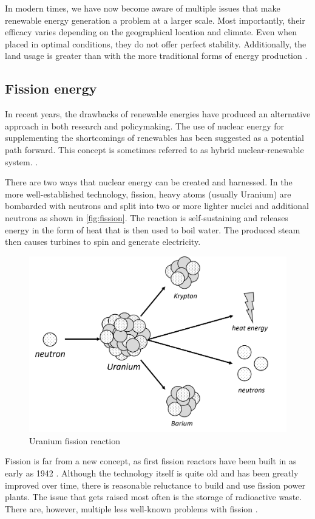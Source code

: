   In modern times, we have now become aware of multiple issues
  that make renewable energy generation a problem at a larger scale.
  Most importantly, their efficacy varies depending on the geographical
  location and climate. Even when placed in optimal conditions,
  they do not offer perfect stability. Additionally, the land
  usage is greater than with the more traditional forms of energy production
  \cite{renewable_problems}.

\subsection{Fission energy}

  In recent years, the drawbacks of renewable energies have produced
  an alternative approach in both research and policymaking. 
  The use of nuclear energy for supplementing the shortcomings 
  of renewables has been suggested as a potential path forward.
  This concept is sometimes referred to as hybrid nuclear-renewable system.
  \cite{hybrid_nuclear_renewable}. 

  There are two ways that nuclear energy can be created and harnessed.
  In the more well-established technology, fission, heavy atoms 
  (usually Uranium) are bombarded with neutrons 
  and split into two or more lighter nuclei and
  additional neutrons as shown in \autoref{fig:fission}.
  The reaction is self-sustaining 
  and releases energy in the form of heat that is then used
  to boil water. The produced steam then causes turbines to spin
  and generate electricity.
	\begin{figure}[H]
	  \centering
	  \includegraphics[width=.75\linewidth]{media/fission.png}
	  \caption{Uranium fission reaction}
	  \label{fig:fission}
	\end{figure}

  Fission is far from a new concept, as first fission reactors have been 
  built in as early as 1942 \cite{first_fission_reactor}. 
  Although the technology itself is quite old 
  and has been greatly improved over time, 
  there is reasonable reluctance to build and use fission power plants. 
  The issue that gets raised most often is the storage of radioactive waste. 
  There are, however, multiple less well-known
  problems with fission \cite{fission_problems}. 


